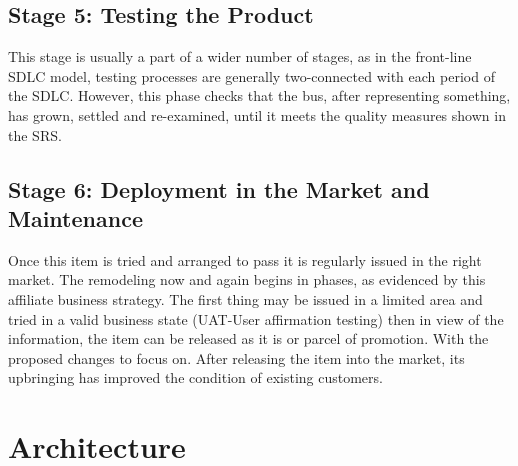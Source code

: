 \documentclass[oneside,12pt]{Classes/VTU}
\begin{document}
    	\subsection{Stage 5: Testing the Product}
    	This stage is usually a part of a wider number of stages, as in the front-line SDLC model, testing processes are generally two-connected with each period of the SDLC. However, this phase checks that the bus, after representing something, has grown, settled and re-examined, until it meets the quality measures shown in the SRS.

    	\subsection{Stage 6: Deployment in the Market and Maintenance}
    	 Once this item is tried and arranged to pass it is regularly issued in the right market. The remodeling now and again begins in phases, as evidenced by this affiliate business strategy. The first thing may be issued in a limited area and tried in a valid business state (UAT-User affirmation testing) then in view of the information, the item can be released as it is or parcel of promotion. With the proposed changes to focus on. After releasing the item into the market, its upbringing has improved the condition of existing customers.
    	
    	\section{Architecture}
    	
\end{document}
